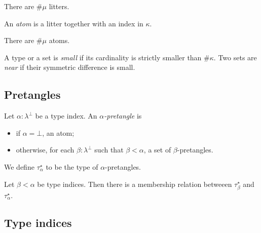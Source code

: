 \documentclass{article}
\begin{document}
\begin{lemma}
    There are \( \#\mu \) litters.
\end{lemma}
\begin{definition}
    An \emph{atom} is a litter together with an index in \( \kappa \).
\end{definition}
\begin{lemma}
    There are \( \#\mu \) atoms.
\end{lemma}
\begin{definition}
    A type or a set is \emph{small} if its cardinality is strictly smaller than \( \#\kappa \).
    Two sets are \emph{near} if their symmetric difference is small.
\end{definition}

\subsection{Pretangles}

\begin{definition}
    Let \( \alpha : \lambda^\bot \) be a type index.
    An \emph{\( \alpha \)-pretangle} is
    \begin{itemize}
        \item if \( \alpha = \bot \), an atom;
        \item otherwise, for each \( \beta : \lambda^\bot \) such that \( \beta < \alpha \), a set of \( \beta \)-pretangles.
    \end{itemize}
    We define \( \tau_\alpha^\star \) to be the type of \( \alpha \)-pretangles.
\end{definition}
\begin{definition}
    Let \( \beta < \alpha \) be type indices.
    Then there is a membership relation betweeen \( \tau_\beta^\star \) and \( \tau_\alpha^\star \).
\end{definition}

\subsection{Type indices}
\end{document}
